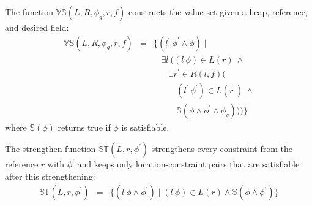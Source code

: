 The function $\mathbb{VS}(L,R,\phi_g,r,f)$ constructs the value-set given a
heap, reference, and desired field:
\[
\begin{array}{rcl}
  \mathbb{VS}(L,R,\phi_g,r,f) & = & \{(l^\prime\ \phi^\prime\wedge\phi) \mid \\
  & & \ \ \ \ \exists l\ ((l\ \phi) \in L(r)\ \wedge \\
  & & \ \ \ \ \ \ \ \ \exists r^\prime \in R(l,f) ( \\
  & & \ \ \ \ \ \ \ \ \ \ \ \ (l^\prime\ \phi^\prime) \in L(r^\prime)\ \wedge\\
  & & \ \ \ \ \ \ \ \ \ \ \ \ \mathbb{S}(\phi\wedge\phi^\prime\wedge \phi_g)))\}
\end{array}
\]
where $\mathbb{S}(\phi)$ returns true if $\phi$ is satisfiable.

The strengthen function $\mathbb{ST}(L,r,\phi^\prime)$ strengthens every
constraint from the reference $r$ with $\phi^\prime$ and keeps only location-constraint
pairs that are satisfiable after this strengthening:
\[
\begin{array}{rcl} 
\mathbb{ST}(L,r,\phi^\prime) & = & \{ (l\ \phi\wedge\phi^\prime) \mid 
(l\ \phi)\in L(r)\wedge\mathbb{S}(\phi\wedge\phi^\prime) \}
\end{array}
\]



